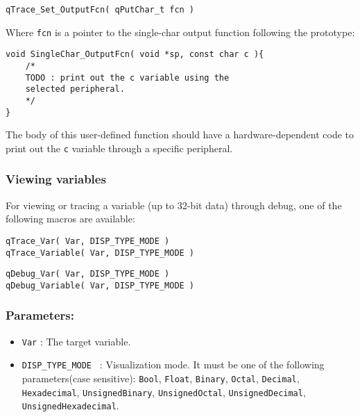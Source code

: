 \begin{lstlisting}[style=CStyle]
qTrace_Set_OutputFcn( qPutChar_t fcn )
\end{lstlisting}

Where \lstinline{fcn} is a pointer to the single-char output function following the prototype:
\medskip

\begin{lstlisting}[style=CStyle]
void SingleChar_OutputFcn( void *sp, const char c ){
    /*
    TODO : print out the c variable using the
    selected peripheral.
    */
}
\end{lstlisting}

The body of this user-defined function should have a hardware-dependent code to print out the \lstinline{c} variable through a specific peripheral.

\subsubsection{Viewing variables}
For viewing or tracing a variable (up to 32-bit data) through debug, one of the following macros are available:
   
\medskip

\begin{lstlisting}[style=CStyle]
qTrace_Var( Var, DISP_TYPE_MODE )
qTrace_Variable( Var, DISP_TYPE_MODE )
\end{lstlisting}
\begin{lstlisting}[style=CStyle]
qDebug_Var( Var, DISP_TYPE_MODE )
qDebug_Variable( Var, DISP_TYPE_MODE )
\end{lstlisting}

\subsubsection*{Parameters:}
\begin{itemize}
    \item \lstinline{Var} : The target variable. 
    \item \lstinline{DISP_TYPE_MODE } :  Visualization mode. It must be one of the following parameters(case sensitive): \lstinline{Bool}, \lstinline{Float}, \lstinline{Binary}, \lstinline{Octal}, \lstinline{Decimal}, \lstinline{Hexadecimal}, \lstinline{UnsignedBinary}, \lstinline{UnsignedOctal}, \lstinline{UnsignedDecimal}, \lstinline{UnsignedHexadecimal}. 
\end{itemize}

